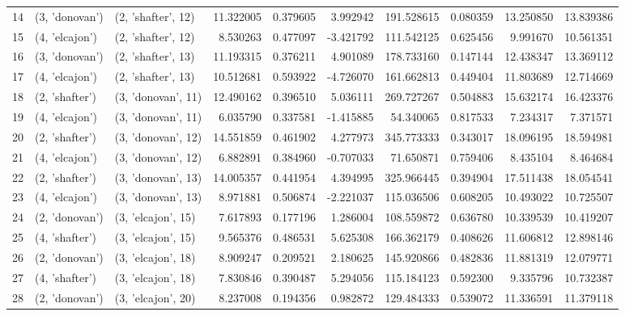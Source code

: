 \begin{tabular}{lllrrrrrrr}
14 &   (3, 'donovan') &  (2, 'shafter', 12) &  11.322005 &  0.379605 &   3.992942 &  191.528615 &  0.080359 &  13.250850 &  13.839386 \\
15 &   (4, 'elcajon') &  (2, 'shafter', 12) &   8.530263 &  0.477097 &  -3.421792 &  111.542125 &  0.625456 &   9.991670 &  10.561351 \\
16 &   (3, 'donovan') &  (2, 'shafter', 13) &  11.193315 &  0.376211 &   4.901089 &  178.733160 &  0.147144 &  12.438347 &  13.369112 \\
17 &   (4, 'elcajon') &  (2, 'shafter', 13) &  10.512681 &  0.593922 &  -4.726070 &  161.662813 &  0.449404 &  11.803689 &  12.714669 \\
18 &   (2, 'shafter') &  (3, 'donovan', 11) &  12.490162 &  0.396510 &   5.036111 &  269.727267 &  0.504883 &  15.632174 &  16.423376 \\
19 &   (4, 'elcajon') &  (3, 'donovan', 11) &   6.035790 &  0.337581 &  -1.415885 &   54.340065 &  0.817533 &   7.234317 &   7.371571 \\
20 &   (2, 'shafter') &  (3, 'donovan', 12) &  14.551859 &  0.461902 &   4.277973 &  345.773333 &  0.343017 &  18.096195 &  18.594981 \\
21 &   (4, 'elcajon') &  (3, 'donovan', 12) &   6.882891 &  0.384960 &  -0.707033 &   71.650871 &  0.759406 &   8.435104 &   8.464684 \\
22 &   (2, 'shafter') &  (3, 'donovan', 13) &  14.005357 &  0.441954 &   4.394995 &  325.966445 &  0.394904 &  17.511438 &  18.054541 \\
23 &   (4, 'elcajon') &  (3, 'donovan', 13) &   8.971881 &  0.506874 &  -2.221037 &  115.036506 &  0.608205 &  10.493022 &  10.725507 \\
24 &   (2, 'donovan') &  (3, 'elcajon', 15) &   7.617893 &  0.177196 &   1.286004 &  108.559872 &  0.636780 &  10.339539 &  10.419207 \\
25 &   (4, 'shafter') &  (3, 'elcajon', 15) &   9.565376 &  0.486531 &   5.625308 &  166.362179 &  0.408626 &  11.606812 &  12.898146 \\
26 &   (2, 'donovan') &  (3, 'elcajon', 18) &   8.909247 &  0.209521 &   2.180625 &  145.920866 &  0.482836 &  11.881319 &  12.079771 \\
27 &   (4, 'shafter') &  (3, 'elcajon', 18) &   7.830846 &  0.390487 &   5.294056 &  115.184123 &  0.592300 &   9.335796 &  10.732387 \\
28 &   (2, 'donovan') &  (3, 'elcajon', 20) &   8.237008 &  0.194356 &   0.982872 &  129.484333 &  0.539072 &  11.336591 &  11.379118 \\

\end{tabular}
